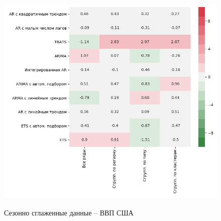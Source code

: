 \documentclass[12pt,a4paper, oneside]{extreport}
\begin{document}
\begin{figure}[H]
\begin{minipage}[H]{0.4\linewidth}
{			\\\includegraphics[width=1\linewidth]{screenshot017}}
	\end{minipage}
	
	
	\centering\footnotesize{Сезонно сглаженные данные -- ВВП США}
	

\end{figure}
\end{document}
